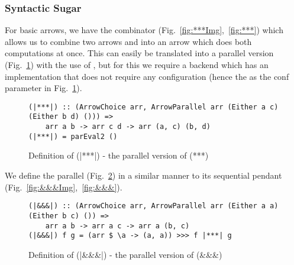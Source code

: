 \subsubsection{Syntactic Sugar} \label{syntacticSugar}
For basic arrows, we have the \inlinecode{(***)} combinator (Fig.~\ref{fig:***Img},~\ref{fig:***}) which allows us to combine two arrows  and  into an arrow  which does both computations at once. This can easily be translated into a parallel version \inlinecode{(|***|)} (Fig.~\ref{fig:|***|}) with the use of , but for this we require a backend which has an implementation that does not require any configuration (hence the \inlinecode{()} as the conf parameter in Fig.~\ref{fig:|***|}).
\begin{figure}[h]
\begin{lstlisting}[frame=htrbl]
(|***|) :: (ArrowChoice arr, ArrowParallel arr (Either a c) (Either b d) ())) =>
	arr a b -> arr c d -> arr (a, c) (b, d)
(|***|) = parEval2 ()
\end{lstlisting}
\caption{Definition of (|***|) - the parallel version of (***)}
\label{fig:|***|}
\end{figure}
We define the parallel \inlinecode{(|\&\&\&|)} (Fig.~\ref{fig:|&&&|}) in a similar manner to its sequential pendant \inlinecode{(\&\&\&)} (Fig.~\ref{fig:&&&Img},~\ref{fig:&&&}).
\begin{figure}[h]
\begin{lstlisting}[frame=htrbl]
(|&&&|) :: (ArrowChoice arr, ArrowParallel arr (Either a a) (Either b c) ()) =>
	arr a b -> arr a c -> arr a (b, c)
(|&&&|) f g = (arr $ \a -> (a, a)) >>> f |***| g
\end{lstlisting} %
\caption{Definition of (|\&\&\&|) - the parallel version of (\&\&\&)}
\label{fig:|&&&|}
\end{figure}